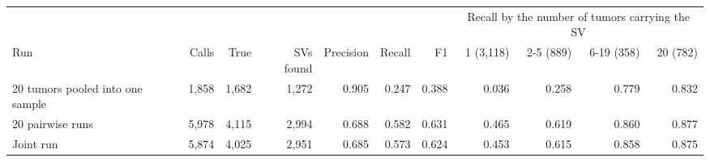 \begin{tabular}{lrrrrrrrrrr}
\toprule
 & & & & & & & \multicolumn{4}{c}{Recall by the number of tumors carrying the SV} \\
\cmidrule(lr){8-11}
Run & Calls & True & SVs found & Precision & Recall & F1 & 1 (3,118) & 2-5 (889) & 6-19 (358) & 20 (782) \\
\midrule
20 tumors pooled into one sample & 1,858 & 1,682 & 1,272 & 0.905 & 0.247 & 0.388 & 0.036 & 0.258 & 0.779 & 0.832 \\
20 pairwise runs & 5,978 & 4,115 & 2,994 & 0.688 & 0.582 & 0.631 & 0.465 & 0.619 & 0.860 & 0.877 \\
Joint run & 5,874 & 4,025 & 2,951 & 0.685 & 0.573 & 0.624 & 0.453 & 0.615 & 0.858 & 0.875 \\
\bottomrule
\end{tabular}
